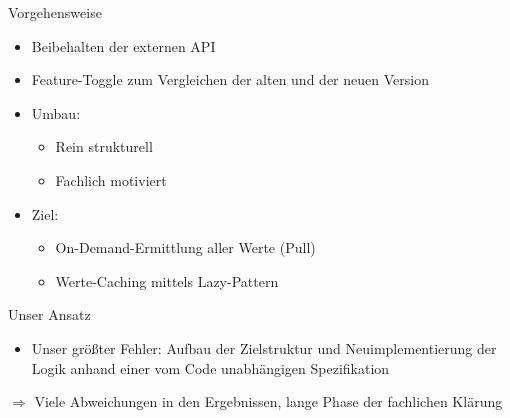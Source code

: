 \begin{frame}[t,fragile]{Vorgehensweise}
\begin{itemize}
\item Beibehalten der externen API
\item Feature-Toggle zum Vergleichen der alten und der neuen Version
\item Umbau:
\begin{itemize}
\item Rein strukturell
\item Fachlich motiviert
\end{itemize}

\item Ziel:
\begin{itemize}
\item On-Demand-Ermittlung aller Werte (\glqq Pull\grqq{})
\item Werte-Caching mittels Lazy-Pattern
\end{itemize}
\end{itemize}
\end{frame}

\begin{frame}[t,fragile]{Unser Ansatz}
\begin{itemize}
\item Unser größter Fehler: Aufbau der Zielstruktur und Neuimplementierung der Logik anhand einer vom Code unabhängigen Spezifikation
\end{itemize}
$\Rightarrow$ Viele Abweichungen in den Ergebnissen, lange Phase der fachlichen Klärung
\end{frame}

%
%
%

